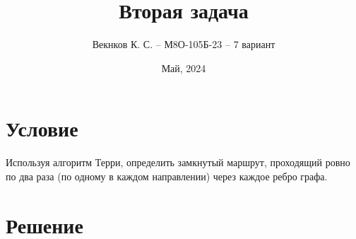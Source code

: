 \documentclass{article}
\title{Вторая задача}
\author{Векнков К. С. -- М8О-105Б-23 -- 7 вариант}
\date{Май, 2024}
\begin{document}
\maketitle
\section*{Условие}
Используя алгоритм Терри, определить замкнутый маршрут, проходящий ровно по два раза
(по одному в каждом направлении) через каждое ребро графа.


\section*{Решение}


\end{document}
